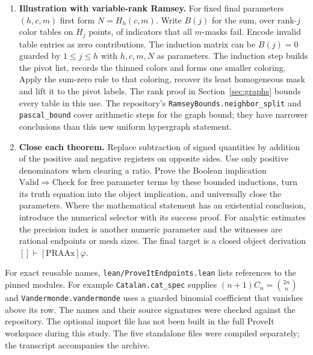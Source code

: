 \begin{enumerate}
\item \textbf{Illustration with variable-rank Ramsey.} For fixed final parameters $(h,c,m)$ first form $N=H_h(c,m)$. Write $B(j)$ for the sum, over rank-$j$ color tables on $H_j$ points, of indicators that all $m$-masks fail. Encode invalid table entries as zero contributions. The induction matrix can be $B(j)=0$ guarded by $1\le j\le h$ with $h,c,m,N$ as parameters. The induction step builds the pivot list, records the thinned colors and forms one smaller coloring. Apply the sum-zero rule to that coloring, recover its least homogeneous mask and lift it to the pivot labels. The rank proof in Section~\ref{sec:graphs} bounds every table in this use. The repository's \texttt{RamseyBounds.neighbor\_split} and \texttt{pascal\_bound} cover arithmetic steps for the graph bound; they have narrower conclusions than this new uniform hypergraph statement.
\item \textbf{Close each theorem.} Replace subtraction of signed quantities by addition of the positive and negative registers on opposite sides. Use only positive denominators when clearing a ratio. Prove the Boolean implication $\mathrm{Valid}\Rightarrow\mathrm{Check}$ for free parameter terms by these bounded inductions, turn its truth equation into the object implication, and universally close the parameters. Where the mathematical statement has an existential conclusion, introduce the numerical selector with its success proof. For analytic estimates the precision index is another numeric parameter and the witnesses are rational endpoints or mesh sizes. The final target is a closed object derivation \( []\vdash[\mathrm{PRAAx}]\varphi\).
\end{enumerate}
For exact reusable names, \texttt{lean/ProveItEndpoints.lean} lists references to the pinned modules. For example \texttt{Catalan.cat\_spec} supplies $(n+1)C_n=\binom{2n}{n}$ and \texttt{Vandermonde.vandermonde} uses a guarded binomial coefficient that vanishes above its row. The names and their source signatures were checked against the repository. The optional import file has not been built in the full ProveIt workspace during this study. The five standalone files were compiled separately; the transcript accompanies the archive.

